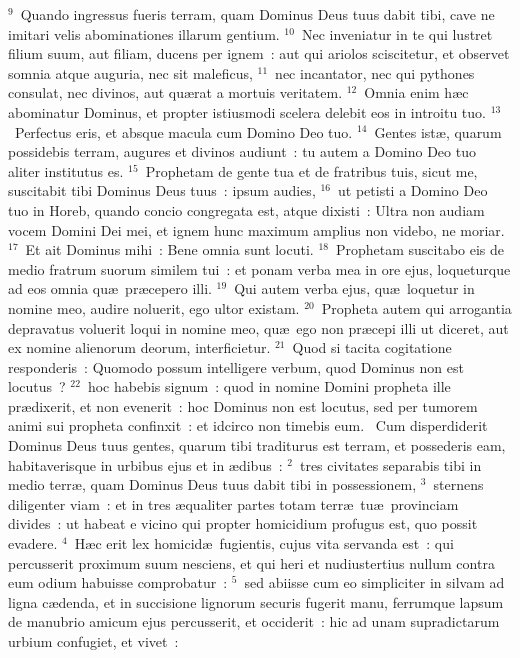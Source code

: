 ${}^{9}$~Quando ingressus fueris terram, quam Dominus Deus tuus dabit tibi, cave ne imitari velis abominationes illarum gentium.
${}^{10}$~Nec inveniatur in te qui lustret filium suum, aut filiam, ducens per ignem~: aut qui ariolos sciscitetur, et observet somnia atque auguria, nec sit maleficus,
${}^{11}$~nec incantator, nec qui pythones consulat, nec divinos, aut qu\ae rat a mortuis veritatem.
${}^{12}$~Omnia enim h\ae c abominatur Dominus, et propter istiusmodi scelera delebit eos in introitu tuo.
${}^{13}$~Perfectus eris, et absque macula cum Domino Deo tuo.
${}^{14}$~Gentes ist\ae , quarum possidebis terram, augures et divinos audiunt~: tu autem a Domino Deo tuo aliter institutus es.
${}^{15}$~Prophetam de gente tua et de fratribus tuis, sicut me, suscitabit tibi Dominus Deus tuus~: ipsum audies,
${}^{16}$~ut petisti a Domino Deo tuo in Horeb, quando concio congregata est, atque dixisti~: Ultra non audiam vocem Domini Dei mei, et ignem hunc maximum amplius non videbo, ne moriar.
${}^{17}$~Et ait Dominus mihi~: Bene omnia sunt locuti.
${}^{18}$~Prophetam suscitabo eis de medio fratrum suorum similem tui~: et ponam verba mea in ore ejus, loqueturque ad eos omnia qu\ae\ pr\ae cepero illi.
${}^{19}$~Qui autem verba ejus, qu\ae\ loquetur in nomine meo, audire noluerit, ego ultor existam.
${}^{20}$~Propheta autem qui arrogantia depravatus voluerit loqui in nomine meo, qu\ae\ ego non pr\ae cepi illi ut diceret, aut ex nomine alienorum deorum, interficietur.
${}^{21}$~Quod si tacita cogitatione responderis~: Quomodo possum intelligere verbum, quod Dominus non est locutus~?
${}^{22}$~hoc habebis signum~: quod in nomine Domini propheta ille pr\ae dixerit, et non evenerit~: hoc Dominus non est locutus, sed per tumorem animi sui propheta confinxit~: et idcirco non timebis eum.
~\lettrine[lines=10,image=true,loversize=0.05,lraise=-0.03]{C}{}um disperdiderit Dominus Deus tuus gentes, quarum tibi traditurus est terram, et possederis eam, habitaverisque in urbibus ejus et in \ae dibus~:
${}^{2}$~tres civitates separabis tibi in medio terr\ae , quam Dominus Deus tuus dabit tibi in possessionem,
${}^{3}$~sternens diligenter viam~: et in tres \ae qualiter partes totam terr\ae\ tu\ae\ provinciam divides~: ut habeat e vicino qui propter homicidium profugus est, quo possit evadere.
${}^{4}$~H\ae c erit lex homicid\ae\ fugientis, cujus vita servanda est~: qui percusserit proximum suum nesciens, et qui heri et nudiustertius nullum contra eum odium habuisse comprobatur~:
${}^{5}$~sed abiisse cum eo simpliciter in silvam ad ligna c\ae denda, et in succisione lignorum securis fugerit manu, ferrumque lapsum de manubrio amicum ejus percusserit, et occiderit~: hic ad unam supradictarum urbium confugiet, et vivet~:
